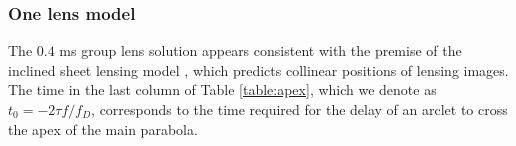 \documentclass[useAMS,usenatbib]{mn2e}
\begin{document}




\subsubsection{One lens model}
\label{222}
The $0.4$ ms group lens solution appears consistent with the premise
of the inclined sheet lensing model \citep{2014MNRAS.442.3338P}, which
predicts collinear positions of lensing images.  The time in the last
column of Table \ref{table:apex}, which we denote as $t_0
=-2{\tau}f/{f_{D}}$, corresponds to the time required 
for the delay of an arclet to cross the apex of the main parabola.
\end{document}
